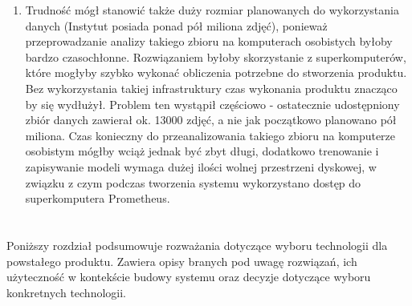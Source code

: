 \documentclass[polish,12pt]{aghthesis}
\begin{document}
\begin{enumerate}
    \item Trudność mógł stanowić także duży rozmiar planowanych do wykorzystania danych (Instytut posiada ponad pół miliona zdjęć), ponieważ przeprowadzanie analizy takiego zbioru na komputerach osobistych byłoby bardzo czasochłonne. Rozwiązaniem byłoby skorzystanie z superkomputerów, które mogłyby szybko wykonać obliczenia potrzebne do stworzenia produktu. Bez wykorzystania takiej infrastruktury czas wykonania produktu znacząco by się wydłużył.
    \newline Problem ten wystąpił częściowo - ostatecznie udostępniony zbiór danych zawierał ok. 13000 zdjęć, a nie jak początkowo planowano pół miliona. Czas konieczny do przeanalizowania takiego zbioru na komputerze osobistym mógłby wciąż jednak być zbyt długi, dodatkowo trenowanie i zapisywanie modeli wymaga dużej ilości wolnej przestrzeni dyskowej, w związku z czym podczas tworzenia systemu wykorzystano dostęp do superkomputera Prometheus.
\end{enumerate}

\newpage

\section{\SectionTitleTechnologicalAnalysis}
\label{sec:analiza-technologiczna}
\par Poniższy rozdział podsumowuje rozważania dotyczące wyboru technologii dla powstałego produktu. Zawiera opisy branych pod uwagę rozwiązań, ich użyteczność w kontekście budowy systemu oraz decyzje dotyczące wyboru konkretnych technologii.
\end{document}
